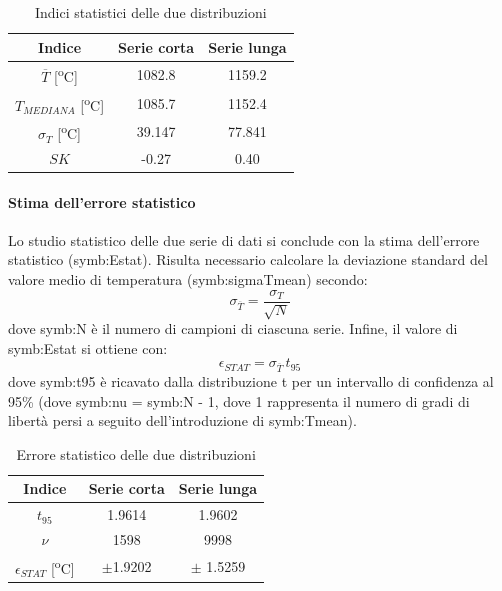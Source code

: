 \begin{table} [H]
	\centering
	\begin{tabular}{c|c|c}
		\toprule
		\toprule
		\textbf{Indice} & \textbf{Serie corta}&\textbf{Serie lunga}\\
		\midrule
		\midrule
		$\overline{T}$ [\textsuperscript{o}C]& 1082.8 & 1159.2\\
		\midrule
		$T_\textit{MEDIANA}$ [\textsuperscript{o}C]&1085.7&1152.4\\
		\midrule
		$\sigma_T$ [\textsuperscript{o}C]&39.147 & 77.841\\
		\midrule
		$SK$ & -0.27 & 0.40 \\
		\bottomrule
		\bottomrule
	\end{tabular}
\caption{Indici statistici delle due distribuzioni}
\label{tab:indicistat}
\end{table}

\paragraph{Stima dell'errore statistico}
Lo studio statistico delle due serie di dati si conclude con la stima dell'errore statistico (\gls{symb:Estat}).  Risulta necessario calcolare la deviazione standard del valore medio di temperatura (\gls{symb:sigmaTmean}) secondo:
\begin{equation}
	\sigma_{\overline{T}} = \frac{\sigma_{T}}{\sqrt{N}} \label{eq:sigmaTmean}
\end{equation}
dove \gls{symb:N} è il numero di campioni di ciascuna serie.
Infine, il valore di \gls{symb:Estat} si ottiene con:
\begin{equation}
	\epsilon_{\textit{STAT}}=\sigma_{\overline{T}}\,t_{\textit{95}}
\end{equation}
dove \gls{symb:t95} è ricavato dalla distribuzione t per un intervallo di confidenza al 95\% (dove \gls{symb:nu} = \gls{symb:N} - 1, dove 1 rappresenta il numero di gradi di libertà persi a seguito dell'introduzione di \gls{symb:Tmean}).
\begin{table} [H]
	\centering
	\begin{tabular}{c|c|c}
		\toprule
		\toprule
		\textbf{Indice} & \textbf{Serie corta}&\textbf{Serie lunga}\\
		\midrule
		\midrule
		$t_{\textit{95}}$ &1.9614&1.9602\\
		\midrule
		$\nu$ & 1598 & 9998\\
		\midrule
		$\epsilon_{\textit{STAT}}$  [\textsuperscript{o}C]& $\pm $1.9202 &  $ \pm$ 1.5259\\
		\bottomrule
		\bottomrule
	\end{tabular}
	\caption{Errore statistico delle due distribuzioni}
	\label{tab:errorestat}
\end{table}

